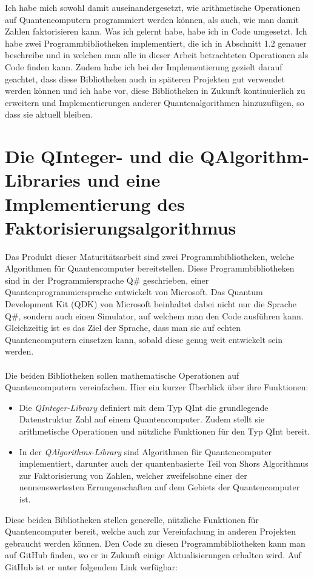 Ich habe mich sowohl damit auseinandergesetzt, wie arithmetische Operationen auf Quantencomputern programmiert werden können, als auch, wie man damit Zahlen faktorisieren kann. Was ich gelernt habe, habe ich in Code umgesetzt. Ich habe zwei Programmbibliotheken implementiert, die ich in Abschnitt 1.2 genauer beschreibe und in welchen man alle in dieser Arbeit betrachteten Operationen als Code finden kann.  Zudem habe ich bei der Implementierung gezielt darauf geachtet, dass diese Bibliotheken auch in späteren Projekten gut verwendet werden können und ich habe vor, diese Bibliotheken in Zukunft kontinuierlich zu erweitern und Implementierungen anderer Quantenalgorithmen hinzuzufügen, so dass sie aktuell bleiben. 

\section{Die QInteger- und die QAlgorithm-Libraries und eine Implementierung des Faktorisierungsalgorithmus}
Das Produkt dieser Maturitätsarbeit sind zwei Programmbibliotheken, welche Algorithmen für Quantencomputer bereitstellen. Diese Programmbibliotheken sind in der Programmiersprache Q\# geschrieben, einer Quantenprogrammiersprache entwickelt von Microsoft. Das Quantum Development Kit (QDK) von Microsoft beinhaltet dabei nicht nur die Sprache Q\#, sondern auch einen Simulator, auf welchem man den Code ausführen kann. Gleichzeitig ist es das Ziel der Sprache, dass man sie auf echten Quantencomputern einsetzen kann, sobald diese genug weit entwickelt sein werden.
\paragraph{}
Die beiden Bibliotheken sollen mathematische Operationen auf Quantencomputern vereinfachen. Hier ein kurzer Überblick über ihre Funktionen: %
\begin{itemize}
  \item Die \textit{QInteger-Library} definiert mit dem Typ \grqq QInt\grqq{} die grundlegende Datenstruktur \grqq Zahl\grqq{} auf einem Quantencomputer. Zudem stellt sie arithmetische Operationen und nützliche Funktionen für den Typ \grqq QInt\grqq{} bereit. %
  \item In der \textit{QAlgorithms-Library} sind Algorithmen für Quantencomputer implementiert, darunter auch der quantenbasierte Teil von Shors Algorithmus zur Faktorisierung von Zahlen, welcher zweifelsohne einer der nennenswertesten Errungenschaften auf dem Gebiets der Quantencomputer ist.
\end{itemize}
Diese beiden Bibliotheken stellen generelle, nützliche Funktionen für Quantencomputer bereit, welche auch zur Vereinfachung in anderen Projekten gebraucht werden können. Den Code zu diesen Programmbibliotheken kann man auf GitHub finden, wo er in Zukunft einige Aktualisierungen erhalten wird. Auf GitHub ist er unter folgendem Link verfügbar:
